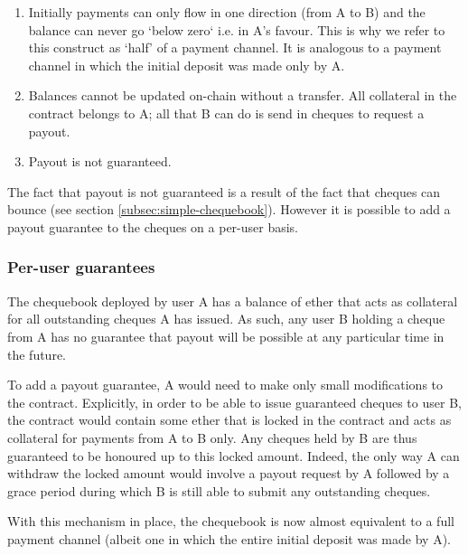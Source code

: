 \begin{enumerate}
    \item Initially payments can only flow in one direction (from A to B) and the balance can never go `below zero` i.e. in A's favour. This is why we refer to this construct as `half' of a payment channel. It is analogous to a payment channel in which the initial deposit was made only by A.
    \item Balances cannot be updated on-chain without a transfer. All collateral in the contract belongs to A; all that B can do is send in cheques to request a payout.%
    \item Payout is not guaranteed. 
\end{enumerate}

The fact that payout is not guaranteed is a result of the fact that cheques can bounce (see section \ref{subsec:simple-chequebook}). However it is possible to add a payout guarantee to the cheques on a per-user basis.

\subsubsection{Per-user guarantees}\label{subsubsec:per-user-guarantees}

The chequebook deployed by user A has a balance of ether that acts as collateral for all outstanding cheques A has issued. As such, any user B holding a cheque from A has no guarantee that payout will be possible at any particular time in the future. 

To add a payout guarantee, A would need to make only small modifications to the contract. Explicitly, in order to be able to issue guaranteed cheques to user B, the contract would contain some ether that is locked in the contract and acts as collateral for payments from A to B only. Any cheques held by B are thus guaranteed to be honoured up to this locked amount. Indeed, the only way A can withdraw the locked amount would involve a payout request by A followed by a grace period during which B is still able to submit any outstanding cheques.

With this mechanism in place, the chequebook is now almost equivalent to a full payment channel (albeit one in which the entire initial deposit was made by A).

